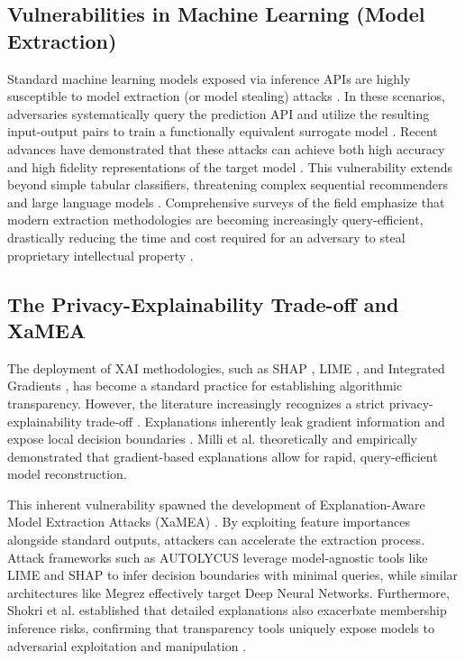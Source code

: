 \documentclass[conference]{IEEEtran}
\begin{document}
\subsection{Vulnerabilities in Machine Learning (Model Extraction)}
Standard machine learning models exposed via inference APIs are highly susceptible to model extraction (or model stealing) attacks \cite{b3, b5}. In these scenarios, adversaries systematically query the prediction API and utilize the resulting input-output pairs to train a functionally equivalent surrogate model \cite{b6}. Recent advances have demonstrated that these attacks can achieve both high accuracy and high fidelity representations of the target model \cite{b7}. This vulnerability extends beyond simple tabular classifiers, threatening complex sequential recommenders \cite{b2} and large language models \cite{b29}. Comprehensive surveys of the field emphasize that modern extraction methodologies are becoming increasingly query-efficient, drastically reducing the time and cost required for an adversary to steal proprietary intellectual property \cite{b30}.

\subsection{The Privacy-Explainability Trade-off and XaMEA}
The deployment of XAI methodologies, such as SHAP \cite{b12}, LIME \cite{b13}, and Integrated Gradients \cite{b14}, has become a standard practice for establishing algorithmic transparency. However, the literature increasingly recognizes a strict privacy-explainability trade-off \cite{b4}. Explanations inherently leak gradient information and expose local decision boundaries \cite{b16}. Milli et al. \cite{b8} theoretically and empirically demonstrated that gradient-based explanations allow for rapid, query-efficient model reconstruction.

This inherent vulnerability spawned the development of Explanation-Aware Model Extraction Attacks (XaMEA) \cite{b1}. By exploiting feature importances alongside standard outputs, attackers can accelerate the extraction process. Attack frameworks such as AUTOLYCUS \cite{b10} leverage model-agnostic tools like LIME and SHAP to infer decision boundaries with minimal queries, while similar architectures like Megrez \cite{b11} effectively target Deep Neural Networks. Furthermore, Shokri et al. \cite{b9} established that detailed explanations also exacerbate membership inference risks, confirming that transparency tools uniquely expose models to adversarial exploitation and manipulation \cite{b15}.
\end{document}
